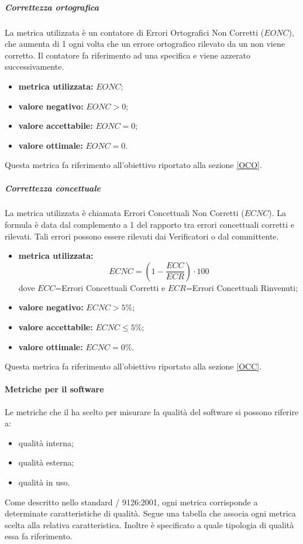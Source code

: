 				\subparagraph{Correttezza ortografica}
				\label{MCO}
				La metrica utilizzata è un contatore di Errori Ortografici Non Corretti ($EONC$), che aumenta di 1 ogni volta che un errore ortografico rilevato da un \verificatore{} non viene corretto. Il contatore fa riferimento ad una specifica  e viene azzerato successivamente.
				\begin{itemize}
					\item \textbf{metrica utilizzata:} $EONC$;
					\item \textbf{valore negativo:} $EONC>0$;
					\item \textbf{valore accettabile:} $EONC=0$;
					\item \textbf{valore ottimale:} $EONC=0$.
				\end{itemize}
				Questa metrica fa riferimento all'obiettivo riportato alla sezione \ref{OCO}.		
						
				\subparagraph{Correttezza concettuale}
				\label{MCC}
				La metrica utilizzata è chiamata Errori Concettuali Non Corretti ($ECNC$). La formula è data dal complemento a 1 del rapporto tra errori concettuali corretti e rilevati. Tali errori possono essere rilevati dai Verificatori o dal committente.
				\begin{itemize}
					\item \textbf{metrica utilizzata:} $$ECNC=\left(1-\frac{ECC}{ECR}\right)\cdot100$$ dove $ECC$=Errori Concettuali Corretti e $ECR$=Errori Concettuali Rinvenuti;
					\item \textbf{valore negativo:} $ECNC>5\%$;
					\item \textbf{valore accettabile:} $ECNC\leq5\%$;
					\item \textbf{valore ottimale:} $ECNC=0\%$.
				\end{itemize}
				Questa metrica fa riferimento all'obiettivo riportato alla sezione \ref{OCC}.
				
			\paragraph{Metriche per il software}
				Le metriche che il  ha scelto per misurare la qualità del software si possono riferire a:
				\begin{itemize}
					\item qualità interna;
					\item qualità esterna;
					\item qualità in uso.
				\end{itemize}
				Come descritto nello standard / 9126:2001, ogni metrica corrisponde a determinate caratteristiche di qualità. Segue una tabella che associa ogni metrica scelta alla relativa caratteristica. Inoltre è specificato a quale tipologia di qualità essa fa riferimento.

